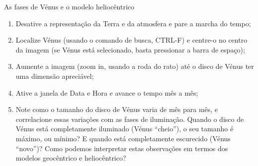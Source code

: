\documentclass[beamer,9pt,aspectratio=169]{beamer}
\begin{document}
\begin{frame}{As fases de Vénus e o modelo heliocêntrico}
  \begin{enumerate}
      \setlength{\itemsep}{2em}
  \item
    Desative a representação da Terra e da atmosfera e pare a marcha do tempo;
  \item
    Localize Vénus (usando o comando de busca, CTRL-F) e centre-o no centro da
    imagem (se Vénus está selecionado, basta pressionar a barra de espaço);
  \item
    Aumente a imagem (zoom in, usando a roda do rato) até o disco de Vénus ter
    uma dimensão apreciável;
  \item
    Ative a janela de Data e Hora e avance o tempo mês a mês;
  \item
    Note como o tamanho do disco de Vénus varia de mês para mês, e correlacione
    essas variações com as fases de iluminação. Quando o disco de Vénus está
    completamente iluminado (Vénus ``cheio''), o seu tamanho é máximo, ou
    mínimo? E quando está completamente escurecido (Vénus ``novo'')? Como
    podemos interpretar estas observações em termos dos modelos geocêntrico e
    heliocêntrico?
\end{enumerate}
\end{frame}
\end{document}
